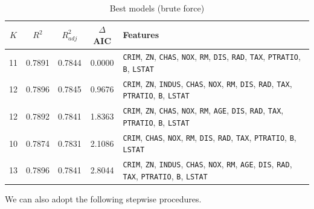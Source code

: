 \documentclass[10pt]{article}
\begin{document}
    \begin{table}[H]
        \centering
        \caption{Best models (brute force)}
        \vspace{0.8em}
        \label{tab:models_all}
        \begin{tabular}{|c|c|c|c|l|} \hline
            $K$ & $R^2$ & $R^2_{adj}$ & $\Delta$AIC & Features \\\hline
            11& 0.7891& 0.7844& 0.0000& \footnotesize\texttt{CRIM}, \texttt{ZN}, \texttt{CHAS}, \texttt{NOX}, \texttt{RM}, \texttt{DIS}, \texttt{RAD}, \texttt{TAX}, \texttt{PTRATIO}, \texttt{B}, \texttt{LSTAT} \\
            12& 0.7896& 0.7845& 0.9676& \footnotesize\texttt{CRIM}, \texttt{ZN}, \texttt{INDUS}, \texttt{CHAS}, \texttt{NOX}, \texttt{RM}, \texttt{DIS}, \texttt{RAD}, \texttt{TAX}, \texttt{PTRATIO}, \texttt{B}, \texttt{LSTAT} \\
            12& 0.7892& 0.7841& 1.8363& \footnotesize\texttt{CRIM}, \texttt{ZN}, \texttt{CHAS}, \texttt{NOX}, \texttt{RM}, \texttt{AGE}, \texttt{DIS}, \texttt{RAD}, \texttt{TAX}, \texttt{PTRATIO}, \texttt{B}, \texttt{LSTAT} \\
            10& 0.7874& 0.7831& 2.1086& \footnotesize\texttt{CRIM}, \texttt{CHAS}, \texttt{NOX}, \texttt{RM}, \texttt{DIS}, \texttt{RAD}, \texttt{TAX}, \texttt{PTRATIO}, \texttt{B}, \texttt{LSTAT} \\
            13& 0.7896& 0.7841& 2.8044& \footnotesize\texttt{CRIM}, \texttt{ZN}, \texttt{INDUS}, \texttt{CHAS}, \texttt{NOX}, \texttt{RM}, \texttt{AGE}, \texttt{DIS}, \texttt{RAD}, \texttt{TAX}, \texttt{PTRATIO}, \texttt{B}, \texttt{LSTAT} \\\hline
        \end{tabular}
    \end{table}

    We can also adopt the following stepwise procedures.
\end{document}
